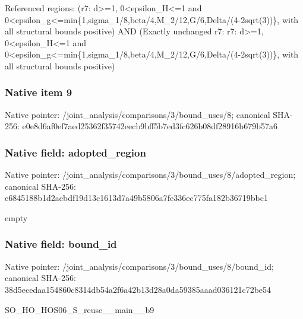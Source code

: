 \documentclass[10pt,a4paper]{article}
\begin{document}
\begingroup\raggedright\sloppy Referenced regions:\allowbreak{} (r7:\allowbreak{} d>=\allowbreak{}1,\allowbreak{} 0<epsilon\_\allowbreak{}H<=\allowbreak{}1 and 0<epsilon\_\allowbreak{}g<=\allowbreak{}min\{1,\allowbreak{}sigma\_\allowbreak{}1/\allowbreak{}8,\allowbreak{}beta/\allowbreak{}4,\allowbreak{}M\_\allowbreak{}2/\allowbreak{}12,\allowbreak{}G/\allowbreak{}6,\allowbreak{}Delta/\allowbreak{}(4-2sqrt(3))\},\allowbreak{} with all structural bounds positive) AND (Exactly unchanged r7:\allowbreak{} r7:\allowbreak{} d>=\allowbreak{}1,\allowbreak{} 0<epsilon\_\allowbreak{}H<=\allowbreak{}1 and 0<epsilon\_\allowbreak{}g<=\allowbreak{}min\{1,\allowbreak{}sigma\_\allowbreak{}1/\allowbreak{}8,\allowbreak{}beta/\allowbreak{}4,\allowbreak{}M\_\allowbreak{}2/\allowbreak{}12,\allowbreak{}G/\allowbreak{}6,\allowbreak{}Delta/\allowbreak{}(4-2sqrt(3))\},\allowbreak{} with all structural bounds positive)\par\endgroup

\subsubsection{Native item 9}
Native pointer: /joint\_\allowbreak{}analysis/comparisons/3/bound\_\allowbreak{}uses/8; canonical SHA-256: e0e8d6af0ef7aed25362f35742eecb9bff5b7ed3fc626b08df28916b679b57a6

\subsubsection{Native field: adopted\_\allowbreak{}region}
Native pointer: /joint\_\allowbreak{}analysis/comparisons/3/bound\_\allowbreak{}uses/8/adopted\_\allowbreak{}region; canonical SHA-256: e6845188b1d2aebdf19d13c1613d7a49b5806a7fe336ec775fa182b36719bbc1

\begingroup\raggedright\sloppy empty\par\endgroup

\subsubsection{Native field: bound\_\allowbreak{}id}
Native pointer: /joint\_\allowbreak{}analysis/comparisons/3/bound\_\allowbreak{}uses/8/bound\_\allowbreak{}id; canonical SHA-256: 38d5ecedaa154860c8314db54a2f6a42b13d28a0da59385aaad036121c72be54

\begingroup\raggedright\sloppy SO\_\allowbreak{}HO\_\allowbreak{}HOS06\_\allowbreak{}S\_\allowbreak{}reuse\_\allowbreak{}\_\allowbreak{}main\_\allowbreak{}\_\allowbreak{}b9\par\endgroup
\end{document}
